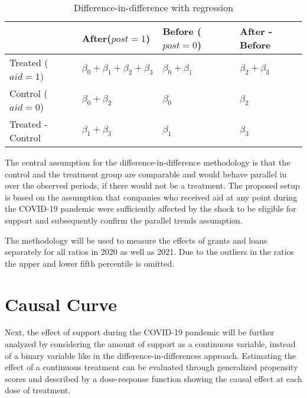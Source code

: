 \begin{table}%
\caption{Difference-in-difference with regression}
\label{tab:DiDcoefficient}
\centering
\def\arraystretch{1.5}

\begin{tabular}{l|l|l|l|}
    \cline{2-4}
                                            & After($post=1$) & Before ($post=0$)& After - Before \\ \hline
    \multicolumn{1}{|l|}{Treated ($aid=1$)}           &  $\beta_{0}+\beta_{1}+\beta_{2}+\beta_{3}$     &  $\beta_{0}+\beta_{1}$      &   $\beta_{2}+\beta_{3}$             \\ \hline
    \multicolumn{1}{|l|}{Control ($aid=0$)}           &  $\beta_{0}+\beta_{2}$     &  $\beta_{0}$      &   $\beta_{2}$             \\ \hline
    \multicolumn{1}{|l|}{Treated - Control} &  $\beta_{1}+\beta_{3}$     &  $\beta_{1}$      &   $\beta_{3}$             \\ \hline
    \end{tabular}

\end{table}

The central assumption for the difference-in-difference methodology is that the control and the treatment group are comparable and would behave parallel in over the observed periods, if there would not be a treatment. The proposed setup is based on the assumption that companies who received aid at any point during the COVID-19 pandemic were sufficiently affected by the shock to be eligible for support and subsequently confirm the parallel trends assumption.

The methodology will be used to measure the effects of grants and loans separately for all ratios in 2020 as well as 2021. Due to the outliers in the ratios the upper and lower fifth percentile is omitted. 








\section{Causal Curve}

Next, the effect of support during the COVID-19 pandemic will be further analyzed by considering the amount of support as a continuous variable, instead of a binary variable like in the difference-in-differences approach. Estimating the effect of a continuous treatment can be evaluated through generalized propensity scores and described by a dose-response function showing the causal effect at each dose of treatment. 

